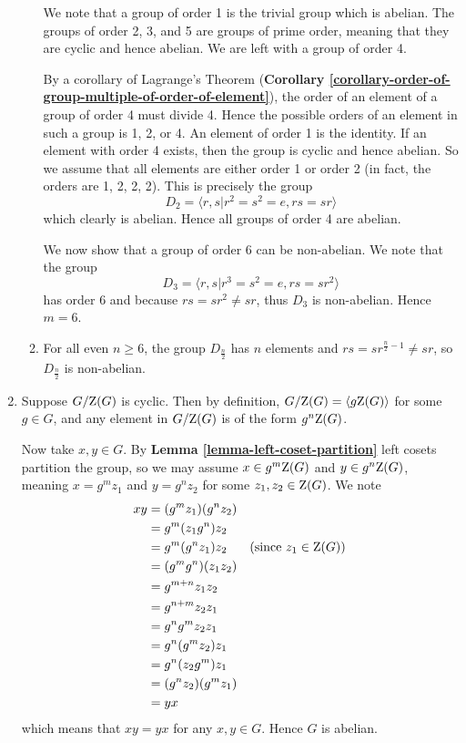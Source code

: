 \begin{enumerate}
\begin{enumerate}[label=(\alph*)]
        We note that a group of order 1 is the trivial group which is abelian. The groups of order 2, 3, and 5 are groups of prime order, meaning that they are cyclic and hence abelian. We are left with a group of order 4.

        By a corollary of Lagrange's Theorem (\textbf{Corollary \ref{corollary-order-of-group-multiple-of-order-of-element}}), the order of an element of a group of order 4 must divide 4. Hence the possible orders of an element in such a group is 1, 2, or 4. An element of order 1 is the identity. If an element with order 4 exists, then the group is cyclic and hence abelian. So we assume that all elements are either order 1 or order 2 (in fact, the orders are 1, 2, 2, 2). This is precisely the group
        \[
            D_2 = \langle r, s \vert r^2 = s^2 = e, rs = sr\rangle
        \]
        which clearly is abelian. Hence all groups of order 4 are abelian.

        We now show that a group of order 6 can be non-abelian. We note that the group
        \[
            D_3 =  \langle r, s \vert r^3 = s^2 = e, rs = sr^2\rangle
        \]
        has order 6 and because $rs = sr^2 \neq sr$, thus $D_3$ is non-abelian. Hence $m = 6$.

        \item For all even $n \geq 6$, the group $D_{\frac n2}$ has $n$ elements and $rs = sr^{\frac n2 - 1} \neq sr$, so $D_{\frac n2}$ is non-abelian.
    \end{enumerate}

    \item Suppose $G / \mathrm{Z}(G)$ is cyclic. Then by definition, $G / \mathrm{Z}(G) = \langle g\mathrm{Z}(G)\rangle$ for some $g \in G$, and any element in $G/\mathrm{Z}(G)$ is of the form $g^n\mathrm{Z}(G)$.

    Now take $x, y \in G$. By \textbf{Lemma \ref{lemma-left-coset-partition}} left cosets partition the group, so we may assume $x \in g^m\mathrm{Z}(G)$ and $y \in g^n\mathrm{Z}(G)$, meaning $x = g^mz_1$ and $y = g^nz_2$ for some $z_1, z_2 \in \mathrm{Z}(G)$. We note
    \begin{align*}
        xy &= (g^mz_1)(g^nz_2)\\
        &= g^m(z_1g^n)z_2\\
        &= g^m(g^nz_1)z_2 & \text{(since }z_1 \in \mathrm{Z}(G))\\
        &= (g^mg^n)(z_1z_2)\\
        &= g^{m+n}z_1z_2\\
        &= g^{n+m}z_2z_1\\
        &= g^ng^mz_2z_1\\
        &= g^n(g^mz_2)z_1\\
        &= g^n(z_2g^m)z_1\\
        &= (g^nz_2)(g^mz_1)\\
        &= yx
    \end{align*}
    which means that $xy = yx$ for any $x, y \in G$. Hence $G$ is abelian.
\end{enumerate}

